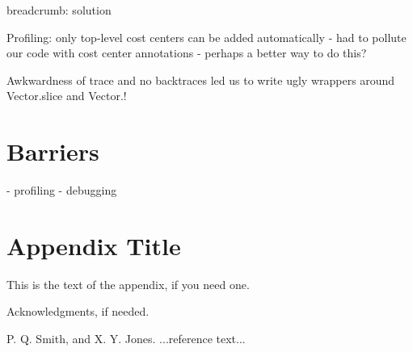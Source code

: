 \documentclass[preprint]{sigplanconf}
\begin{document}
breadcrumb: solution
 
Profiling: only top-level cost centers can be added automatically
 - had to pollute our code with cost center annotations
 - perhaps a better way to do this?
 
Awkwardness of trace and no backtraces led us to write ugly wrappers around Vector.slice and Vector.!


\section{Barriers}

- profiling
- debugging


\appendix
\section{Appendix Title}

This is the text of the appendix, if you need one.

\acks

Acknowledgments, if needed.





\begin{thebibliography}{}
\softraggedright

P. Q. Smith, and X. Y. Jones. ...reference text...

\end{thebibliography}
\end{document}
